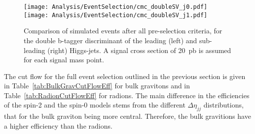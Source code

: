 \begin{figure}[H]
\centering
\texttt{[image: Analysis/EventSelection/cmc\_doubleSV\_j0.pdf]}
\texttt{[image: Analysis/EventSelection/cmc\_doubleSV\_j1.pdf]}
\caption{ Comparison of simulated events after all pre-selection criteria, for the double b-tagger discriminant
  of the leading (left) and sub-leading (right) Higgs-jets. A signal cross section of 20~pb is assumed for each signal mass point.
\label{fig:doublesv_prebtag}
}
\end{figure}

The cut flow for the full event selection outlined in the previous section is given in Table~\ref{tab:BulkGravCutFlowEff} for bulk gravitons and in Table~\ref{tab:RadionCutFlowEff} for radions. The main difference in the efficiencies of the spin-2 and the spin-0 models stems from the different $\Delta\eta_{jj}$ distributions, that for the bulk graviton being more central. Therefore, the bulk gravitions have a higher efficiency than the radions.

